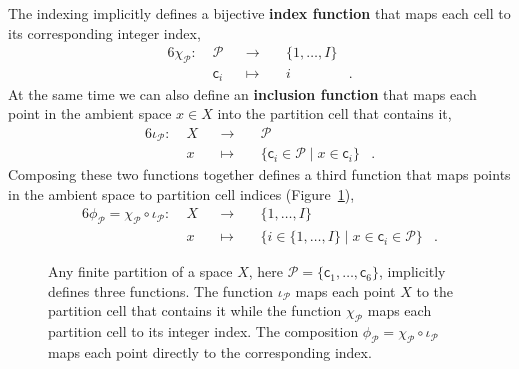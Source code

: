 \documentclass[
  letterpaper,
  DIV=11,
  numbers=noendperiod]{scrartcl}
\begin{document}
The indexing implicitly defines a bijective \textbf{index function} that
maps each cell to its corresponding integer index, \begin{alignat*}{6}
\chi_{\mathcal{P}}
:\; &\mathcal{P}& &\rightarrow& \; &\{1, \ldots, I \}&
\\
&\mathsf{c}_{i}& &\mapsto& &i&.
\end{alignat*} At the same time we can also define an \textbf{inclusion
function} that maps each point in the ambient space \(x \in X\) into the
partition cell that contains it, \begin{alignat*}{6}
\iota_{\mathcal{P}}
:\; &X& &\rightarrow& \; &\mathcal{P}&
\\
&x& &\mapsto&
&\{ \mathsf{c}_{i} \in \mathcal{P} \mid x \in \mathsf{c}_{i} \}&.
\end{alignat*} Composing these two functions together defines a third
function that maps points in the ambient space to partition cell indices
(Figure~\ref{fig-index-maps}), \begin{alignat*}{6}
\phi_{\mathcal{P}} = \chi_{\mathcal{P}} \circ \iota_{\mathcal{P}}
:\; &X& &\rightarrow& \; &\{1, \ldots, I \}&
\\
&x& &\mapsto&
&\{ i \in \{1, \ldots, I \} \mid
    x \in \mathsf{c}_{i} \in \mathcal{P} \}&.
\end{alignat*}

\begin{figure}


\caption{\label{fig-index-maps}Any finite partition of a space \(X\),
here \(\mathcal{P} =
\{ \mathsf{c}_{1}, \ldots, \mathsf{c}_{6} \}\), implicitly defines three
functions. The function \(\iota_{\mathcal{P}}\) maps each point \(X\) to
the partition cell that contains it while the function
\(\chi_{\mathcal{P}}\) maps each partition cell to its integer index.
The composition
\(\phi_{\mathcal{P}} = \chi_{\mathcal{P}} \circ \iota_{\mathcal{P}}\)
maps each point directly to the corresponding index.}

\end{figure}%
\end{document}
